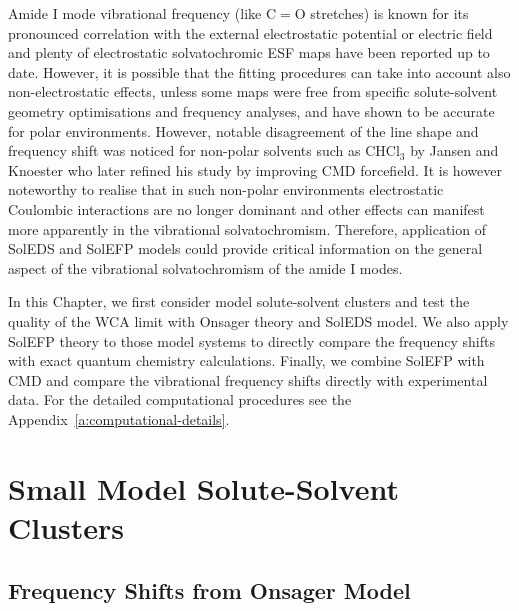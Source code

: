 \documentclass[a4paper,titlepage,twoside,fleqn,12pt]{book}
\begin{document}
\begin{refsection}
Amide I mode vibrational frequency (like C$=$O stretches) 
is known for its pronounced
correlation with the external electrostatic potential or
electric field and plenty of electrostatic solvatochromic
ESF maps have been reported up to date. \citep{Hayashi.Zhuang.Mukamel.JPCA.2005,Jansen.Knoester.JCP.2006,
Lee.Choi.Cho.JCP.2012,Torii.JCPL.2015}
However, it is possible that the fitting procedures
can take into account also non\hyp{}electrostatic effects,
unless some maps were free from specific solute\hyp{}solvent
geometry optimisations and frequency analyses,
and have shown to be accurate for polar environments. \citep{Hayashi.Zhuang.Mukamel.JPCA.2005,Jansen.Knoester.JCP.2006}
However, notable disagreement of the line shape and frequency shift was noticed for
non\hyp{}polar solvents such as CHCl$_3$ by Jansen and Knoester \citep{Jansen.Knoester.JCP.2006}
who later refined his study by improving CMD forcefield. \citep{Jansen.JPCB.2014}
It is however noteworthy to realise that in such non\hyp{}polar
environments electrostatic Coulombic interactions are no longer
dominant and other effects can manifest more apparently
in the vibrational solvatochromism. Therefore, application of
SolEDS and SolEFP models could provide critical information
on the general aspect of the vibrational solvatochromism of the amide I modes.

In this Chapter, we first consider model solute\hyp{}solvent
clusters and test the quality of the WCA limit with Onsager theory
and SolEDS model.
We also apply SolEFP theory to those model systems
to directly compare the frequency shifts with exact quantum chemistry
calculations. \citep{Blasiak.Lee.Cho.JCP.2013,Blasiak.Cho.JCP.2014,Blasiak.Cho.JCP.2015} 
Finally, we combine SolEFP with CMD and compare the vibrational
frequency shifts directly with experimental data. \citep{Blasiak.Cho.JCP.2015}
For the detailed computational procedures see the Appendix~\ref{a:computational-details}.



\section{Small Model Solute\hyp{}Solvent Clusters}

\subsection{Frequency Shifts from Onsager Model\label{s:amide-I-onsager}}


\end{refsection}
\end{document}
